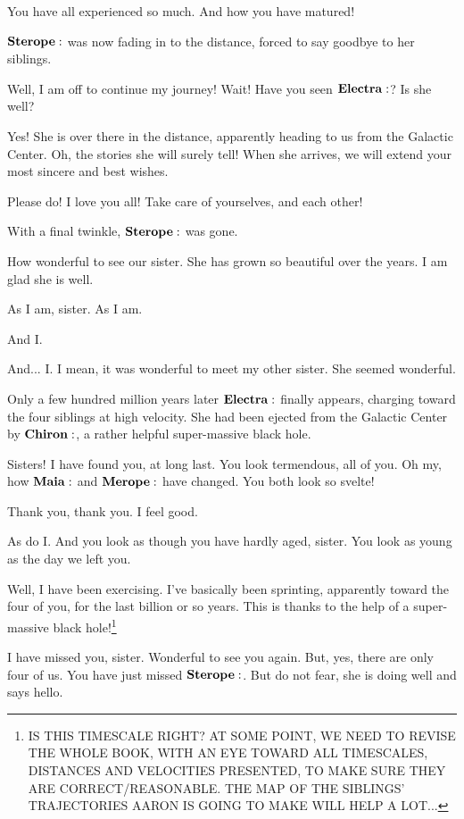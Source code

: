 \documentclass[main.tex]{subfiles}
\begin{document}
\Sterope You have all experienced so much.  And how you have matured!  

$\Sterope$ was now fading in to the distance, forced to say goodbye to her siblings.

\Sterope Well, I am off to continue my journey!  Wait!  Have you seen $\Electra$?  Is she well?

\Celaeno Yes!  She is over there in the distance, apparently heading to us from the Galactic Center.  Oh, the stories she will surely tell!  When she arrives, we will extend your most sincere and best wishes.

\Sterope Please do!  I love you all!  Take care of yourselves, and each other!

With a final twinkle, $\Sterope$ was gone.

\Maia How wonderful to see our sister.  She has grown so beautiful over the years.  I am glad she is well.

\Merope As I am, sister.  As I am.

\Celaeno And I.

\Lacedaemon And... I.  I mean, it was wonderful to meet my other sister.  She seemed wonderful.

Only a few hundred million years later $\Electra$ finally appears, charging toward the four siblings at high velocity.  She had been ejected from the Galactic Center by $\Chiron$, a rather helpful super-massive black hole.  

\Electra Sisters!  I have found you, at long last.  You look termendous, all of you.  Oh my, how $\Maia$ and $\Merope$ have changed.  You both look so svelte!

\Maia Thank you, thank you.  I feel good.

\Merope As do I.  And you look as though you have hardly aged, sister.  You look as young as the day we left you.

\Electra Well, I have been exercising.  I've basically been sprinting, apparently toward the four of you, for the last billion or so years.  This is thanks to the help of a super-massive black hole!\footnote{IS THIS TIMESCALE RIGHT?  AT SOME POINT, WE NEED TO REVISE THE WHOLE BOOK, WITH AN EYE TOWARD ALL TIMESCALES, DISTANCES AND VELOCITIES PRESENTED, TO MAKE SURE THEY ARE CORRECT/REASONABLE.  THE MAP OF THE SIBLINGS' TRAJECTORIES AARON IS GOING TO MAKE WILL HELP A LOT...}  

\Celaeno I have missed you, sister.  Wonderful to see you again.  But, yes, there are only four of us.  You have just missed $\Sterope$.  But do not fear, she is doing well and says hello.
\end{document}
